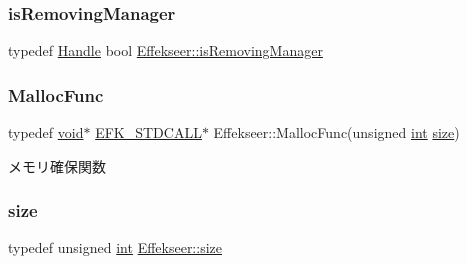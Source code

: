 \mbox{\label{namespace_effekseer_a153d1bcf5fd3c14124e04d0dadf6827c}} 
\subsubsection{\texorpdfstring{is\+Removing\+Manager}{isRemovingManager}}
{\footnotesize\ttfamily typedef \mbox{\hyperlink{namespace_effekseer_afba58b8d812da862190e9bbfc040824a}{Handle}} bool \mbox{\hyperlink{namespace_effekseer_a153d1bcf5fd3c14124e04d0dadf6827c}{Effekseer\+::is\+Removing\+Manager}}}

\mbox{\label{namespace_effekseer_a2f9a04a7b2d08a8f2173ce47e57ff742}} 
\subsubsection{\texorpdfstring{Malloc\+Func}{MallocFunc}}
{\footnotesize\ttfamily typedef \mbox{\hyperlink{namespace_effekseer_ab34c4088e512200cf4c2716f168deb56}{void}}$\ast$ \mbox{\hyperlink{_effekseer_8h_a4b2fd0bd069299f55649055bbd485d7f}{E\+F\+K\+\_\+\+S\+T\+D\+C\+A\+LL}}$\ast$ Effekseer\+::\+Malloc\+Func(unsigned \mbox{\hyperlink{namespace_effekseer_ace0abf7c2e6947e519ebe8b54cbcc30a}{int}} \mbox{\hyperlink{namespace_effekseer_a73c68f3d33539d30844b9d1e058077f7}{size}})}



メモリ確保関数 

\mbox{\label{namespace_effekseer_a73c68f3d33539d30844b9d1e058077f7}} 
\subsubsection{\texorpdfstring{size}{size}}
{\footnotesize\ttfamily typedef unsigned \mbox{\hyperlink{namespace_effekseer_ace0abf7c2e6947e519ebe8b54cbcc30a}{int}} \mbox{\hyperlink{namespace_effekseer_a73c68f3d33539d30844b9d1e058077f7}{Effekseer\+::size}}}

\mbox{\label{namespace_effekseer_a694a300b9b688ca40f6a0d9841d437bf}} 
